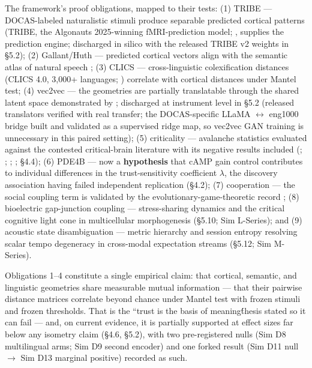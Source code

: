 \documentclass[11pt,twocolumn]{article}
\theoremstyle{plain}
\begin{document}
The framework's proof obligations, mapped to their tests: (1) TRIBE — DOCAS-labeled naturalistic stimuli produce separable predicted cortical patterns (TRIBE, the Algonauts 2025-winning fMRI-prediction model; \citealp{dascoli2025,dascoli2026}, supplies the prediction engine; discharged in silico with the released TRIBE v2 weights in \S{}5.2); (2) Gallant/Huth — predicted cortical vectors align with the semantic atlas of natural speech \citep{huth2016}; (3) CLICS — cross-linguistic colexification distances (CLICS 4.0, 3,000+ languages; \citealp{rzymski2020}) correlate with cortical distances under Mantel test; (4) vec2vec — the geometries are partially translatable through the shared latent space demonstrated by \citet{jha2025}; discharged at instrument level in \S{}5.2 (released translators verified with real transfer; the DOCAS-specific LLaMA $\leftrightarrow$ eng1000 bridge built and validated as a supervised ridge map, so vec2vec GAN training is unnecessary in this paired setting); (5) criticality — avalanche statistics evaluated against the contested critical-brain literature with its negative results included (\citealp{beggs2003}; \citealp{touboul2010,touboul2017}; \citealp{destexhe2021}; \citealp{srinivasan2024}; \S{}4.4); (6) PDE4B — now a \textbf{hypothesis} that cAMP gain control contributes to individual differences in the trust-sensitivity coefficient $\lambda$, the discovery association having failed independent replication (\S{}4.2); (7) cooperation — the social coupling term is validated by the evolutionary-game-theoretic record \citep{axelrod1984,imhof2007}; (8) bioelectric gap-junction coupling — stress-sharing dynamics and the critical cognitive light cone in multicellular morphogenesis (\S{}5.10; Sim L-Series); and (9) acoustic state disambiguation — metric hierarchy and session entropy resolving scalar tempo degeneracy in cross-modal expectation streams (\S{}5.12; Sim M-Series).

Obligations 1–4 constitute a single empirical claim: that cortical, semantic, and linguistic geometries share measurable mutual information — that their pairwise distance matrices correlate beyond chance under Mantel test with frozen stimuli and frozen thresholds. That is the ``trust is the basis of meaning\'\' thesis stated so it can fail — and, on current evidence, it is partially supported at effect sizes far below any isometry claim (\S{}4.6, \S{}5.2), with two pre-registered nulls (Sim D8 multilingual arms; Sim D9 second encoder) and one forked result (Sim D11 null $\to$ Sim D13 marginal positive) recorded as such.
\end{document}
